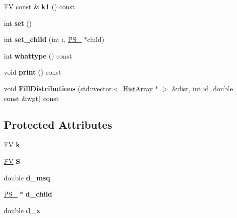 \begin{DoxyCompactItemize}
\item 
\hypertarget{classPS__2__1_a8896fae62d323bceb002628a95466f3f}{\hyperlink{classFV}{F\-V} const \& {\bfseries k1} () const }\label{classPS__2__1_a8896fae62d323bceb002628a95466f3f}

\item 
\hypertarget{classPS__2__1_a02e613ae4acac6c2ea9c57a49a8e3f68}{int {\bfseries set} ()}\label{classPS__2__1_a02e613ae4acac6c2ea9c57a49a8e3f68}

\item 
\hypertarget{classPS__2__1_a3bcae5991298ad9a2fc143d4461c60fa}{int {\bfseries set\-\_\-child} (int i, \hyperlink{classPS__2}{P\-S\-\_} $\ast$child)}\label{classPS__2__1_a3bcae5991298ad9a2fc143d4461c60fa}

\item 
\hypertarget{classPS__2__1_aaa0d8ed0b5e2673cb5f2cd84f090e1f9}{int {\bfseries whattype} () const }\label{classPS__2__1_aaa0d8ed0b5e2673cb5f2cd84f090e1f9}

\item 
\hypertarget{classPS__2__1_a21760964ae4b35c2cfeff16b4c569c3a}{void {\bfseries print} () const }\label{classPS__2__1_a21760964ae4b35c2cfeff16b4c569c3a}

\item 
\hypertarget{classPS__2__1_ad48ac029330395dfa3f8ef968e305902}{void {\bfseries Fill\-Distributions} (std\-::vector$<$ \hyperlink{classHistArray}{Hist\-Array} $\ast$ $>$ \&dist, int id, double const \&wgt) const }\label{classPS__2__1_ad48ac029330395dfa3f8ef968e305902}

\end{DoxyCompactItemize}
\subsection*{Protected Attributes}
\begin{DoxyCompactItemize}
\item 
\hypertarget{classPS__2__1_a3606766aee8e4775462c15adda3acbc5}{\hyperlink{classFV}{F\-V} {\bfseries k}}\label{classPS__2__1_a3606766aee8e4775462c15adda3acbc5}

\item 
\hypertarget{classPS__2__1_a621e0e169e90c4ea5545f8b340d86ed9}{\hyperlink{classFV}{F\-V} {\bfseries S}}\label{classPS__2__1_a621e0e169e90c4ea5545f8b340d86ed9}

\item 
\hypertarget{classPS__2__1_a415b225aedab250a67aee39ef0d859bc}{double {\bfseries d\-\_\-msq}}\label{classPS__2__1_a415b225aedab250a67aee39ef0d859bc}

\item 
\hypertarget{classPS__2__1_a015027e1fc8e30949ea8a439cfedddd4}{\hyperlink{classPS__2}{P\-S\-\_} $\ast$ {\bfseries d\-\_\-child}}\label{classPS__2__1_a015027e1fc8e30949ea8a439cfedddd4}

\item 
\hypertarget{classPS__2__1_af18aa8f6679b7ac65be236b00e794e0c}{double {\bfseries d\-\_\-x}}\label{classPS__2__1_af18aa8f6679b7ac65be236b00e794e0c}

\end{DoxyCompactItemize}
